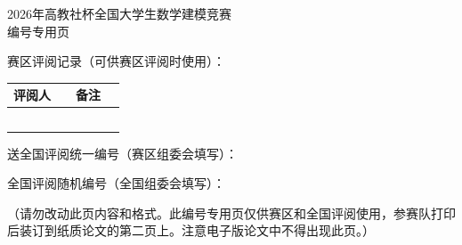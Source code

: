 \thispagestyle{empty}
\begin{center}
  {\heiti 2026年高教社杯全国大学生数学建模竞赛}\\[6pt]
  {\heiti 编\quad 号\quad 专\quad 用\quad 页}
\end{center}

\vspace{2em}
{\heiti 赛区评阅记录（可供赛区评阅时使用）：}

\vspace{1em}
\renewcommand{\arraystretch}{1.8}
\begin{center}
\begin{tabular}{|p{2.2cm}|p{4.5cm}|p{2.2cm}|p{5.5cm}|}
  \hline
  评阅人 &  & 备注 & \\
  \hline
   &  &  & \\
  \hline
  &  &  & \\
  \hline
  &  &  & \\
  \hline
  &  &  & \\
  \hline
  &  &  & \\
  \hline
\end{tabular}
\end{center}

\vspace{2em}
送全国评阅统一编号（赛区组委会填写）：\underline{\makebox[8em]{}}\par
\vspace{1.5em}
全国评阅随机编号（全国组委会填写）：\underline{\makebox[8em]{}}\par

\vspace{2.5em}
{
（请勿改动此页内容和格式。此编号专用页仅供赛区和全国评阅使用，参赛队打印后装订到纸质论文的第二页上。注意电子版论文中不得出现此页。）}

\clearpage
